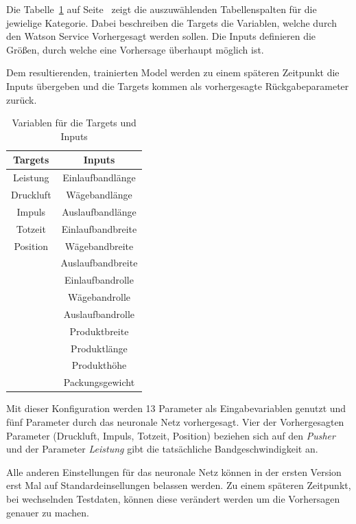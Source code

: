 Die Tabelle~\ref{tab:targets_inputs} auf Seite~\pageref{tab:targets_inputs} zeigt die auszuwählenden Tabellenspalten für
die jewielige Kategorie. Dabei beschreiben die Targets die Variablen, welche durch den Watson Service Vorhergesagt werden
sollen. Die Inputs definieren die Größen, durch welche eine Vorhersage überhaupt möglich ist.

Dem resultierenden, trainierten Model werden zu einem späteren Zeitpunkt die Inputs übergeben und die Targets kommen als
vorhergesagte Rückgabeparameter zurück.

\begin{table}[hb]
    \centering
    \begin{tabular}{|c|c|}
        \hline
        \textbf{Targets} & \textbf{Inputs}\\
        \hline
        \hline
        Leistung & Einlaufbandlänge\\
        \hline
        Druckluft & Wägebandlänge\\
        \hline
        Impuls & Auslaufbandlänge\\
        \hline
        Totzeit & Einlaufbandbreite\\
        \hline
        Position & Wägebandbreite\\
        \hline
        & Auslaufbandbreite\\
        \hline
        & Einlaufbandrolle\\
        \hline
        & Wägebandrolle\\
        \hline
        & Auslaufbandrolle\\
        \hline
        & Produktbreite\\
        \hline
        & Produktlänge\\
        \hline
        & Produkthöhe\\
        \hline
        & Packungsgewicht\\
        \hline
    \end{tabular}
    \caption{Variablen für die Targets und Inputs}
    \label{tab:targets_inputs}
\end{table}

Mit dieser Konfiguration werden 13 Parameter als Eingabevariablen genutzt und fünf Parameter durch das neuronale Netz
vorhergesagt. Vier der Vorhergesagten Parameter (Druckluft, Impuls, Totzeit, Position) beziehen sich auf den
\textit{Pusher} und der Parameter \textit{Leistung} gibt die tatsächliche Bandgeschwindigkeit an.

Alle anderen Einstellungen für das neuronale Netz können in der ersten Version erst Mal auf Standardeinsellungen belassen
werden. Zu einem späteren Zeitpunkt, bei wechselnden Testdaten, können diese verändert werden um die Vorhersagen
genauer zu machen.

